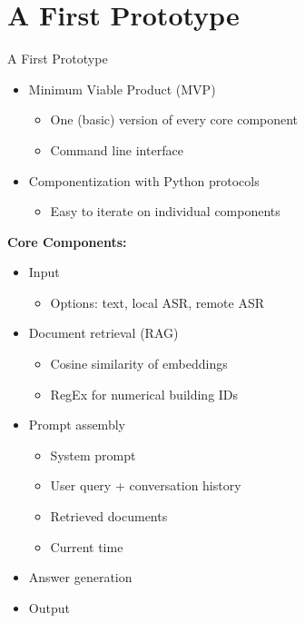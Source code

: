 \documentclass{sdqbeamer}[smallfoot]
\begin{document}
\section{A First Prototype}
\begin{frame}{A First Prototype}
    \vspace{-1.0cm}
    \begin{itemize}
        \item Minimum Viable Product (MVP)
            \begin{itemize}
                \item One (basic) version of every core component
                \item Command line interface
            \end{itemize}
        \item Componentization with Python protocols
            \begin{itemize}
                \item Easy to iterate on individual components
            \end{itemize}
    \end{itemize}
    \vspace{0.5cm}
    \textbf{Core Components:}
    \begin{itemize}
        \item Input
            \begin{itemize}
                \item Options: text, local ASR, remote ASR
            \end{itemize}
        \item Document retrieval (RAG)
            \begin{itemize}
                \item Cosine similarity of embeddings
                \item RegEx for numerical building IDs
            \end{itemize}
        \item Prompt assembly
            \begin{itemize}
                \item System prompt
                \item User query + conversation history
                \item Retrieved documents
                \item Current time
            \end{itemize}
        \item Answer generation
        \item Output
    \end{itemize}
\end{frame}
\end{document}
